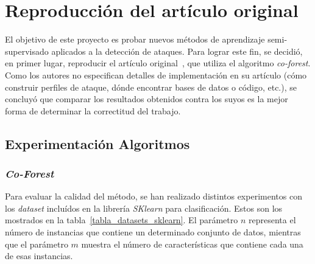 


\section{Reproducción del artículo original}

El objetivo de este proyecto es probar nuevos métodos de aprendizaje semi-supervisado aplicados a la detección de ataques. Para lograr este fin, se decidió, en primer lugar, reproducir el artículo original~\cite{zhou2021SemisupervisedRecommendationAttack}, que utiliza el algoritmo \textit{co-forest}. Como los autores no especifican detalles de implementación en su artículo (cómo construir perfiles de ataque, dónde encontrar bases de datos o código, etc.), se concluyó que comparar los resultados obtenidos contra los suyos es la mejor forma de determinar la correctitud del trabajo.

\subsection{Experimentación Algoritmos}

\subsubsection{\textit{Co-Forest}}
Para evaluar la calidad del método, se han realizado distintos experimentos con los \textit{dataset} incluídos en la librería \textit{SKlearn} para clasificación. Estos son los mostrados en la tabla~\ref{tabla_datasets_sklearn}. El parámetro $n$ representa el número de instancias que contiene un determinado conjunto de datos, mientras que el parámetro $m$ muestra el número de características que contiene cada una de esas instancias.

